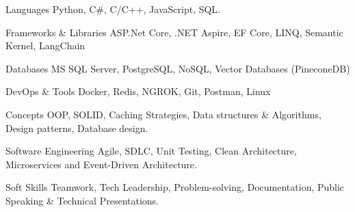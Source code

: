 

\begin{cvskills}

  \cvskill
    {Languages} %
    {Python, C\#, C/C++, JavaScript, SQL.}

  \cvskill
    {Frameworks \& Libraries} %
    {ASP.Net Core, .NET Aspire, EF Core, LINQ, Semantic Kernel, LangChain}

  \cvskill
    {Databases} %
    {MS SQL Server, PostgreSQL, NoSQL, Vector Databases (PineconeDB)}

 \cvskill
    {DevOps \& Tools} %
    {Docker, Redis, NGROK, Git, Postman, Linux}

\cvskill
    {Concepts} %
    {OOP, SOLID, Caching Strategies, Data structures \& Algorithms, Design patterns, Database design. }  

\cvskill
    {Software Engineering} %
    {Agile, SDLC, Unit Testing, Clean Architecture, Microservices and Event-Driven Architecture. }  

  \cvskill
    {Soft Skills} %
    {Teamwork, Tech Leadership, Problem-solving, Documentation, Public Speaking \& Technical Presentations.} %

\end{cvskills}
 